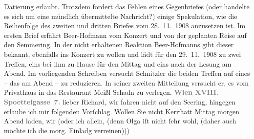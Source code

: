 \begin{ledgroupsized}[t]{13cm}
{{{                        Datierung erlaubt. Trotzdem fordert das Fehlen eines Gegenbriefes (oder
                        handelte es sich um eine mündlich übermittelte Nachricht?) einige
                        Spekulation, wie die Reihenfolge des zweiten und dritten Briefes vom
                           28. 11. 1908 anzusetzen ist. Im ersten Brief erfährt Beer-Hofmann vom Konzert und von der geplanten Reise
                        auf den Semmering. In der nicht
                        erhaltenen Reaktion Beer-Hofmanns
                        gibt dieser bekannt, ebenfalls ins Konzert zu wollen und lädt für den
                           29. 11. 1908 zu zwei Treffen, eins bei ihm zu Hause für den
                        Mittag und eins nach der Lesung am Abend. Im vorliegenden Schreiben versucht
                           Schnitzler die beiden Treffen auf
                        eines – das am Abend – zu reduzieren. In seiner zweiten Mitteilung versucht
                        er, es vom Privathaus in das Restaurant Meißl
                              {\kaufmannsund} Schadn zu verlegen.}}}\label{K_L01813-1h}\pend
           \pstart
           \textcolor{gray}{\textbf{Wien XVIII. Spoettelgasse 7.}}\pend
           \pstart
           lieber Richard, wir fahren nicht auf den Se{\geminationm}ering, hingegen erlaube ich mir
               folgenden Vorſchlag. Wollen Sie nicht Kerrſtatt Mittag morgen Abend laden, wir (oder ich
               allein, (denn {\pb}Olga iſt nicht ſehr wohl, (daher \introOben{}auch\introOben{} möchte ich die morg. Einladg verreinen)))

\end{ledgroupsized}
